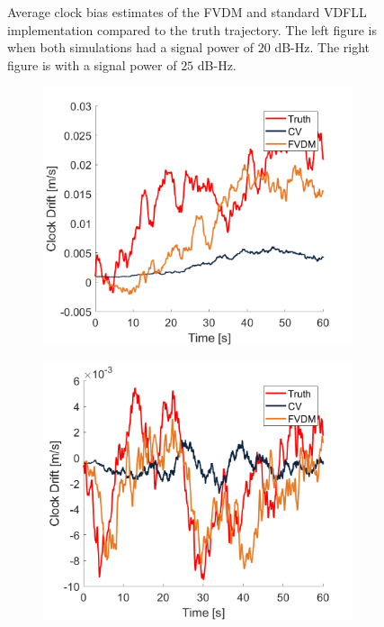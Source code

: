 \begin{figure}[!ht]
\begin{subfigure}{.45\textwidth}
    \end{subfigure}
    \caption{Average clock bias estimates of the FVDM and standard VDFLL implementation compared to the truth trajectory. The left figure is when both simulations had a signal power of \(20\) dB-Hz. The right figure is with a signal power of \(25\) dB-Hz.}\label{fig:Clocks3}
\end{figure}

\begin{figure}[!ht]
    \begin{subfigure}{.45\textwidth}
        \centering
        \includegraphics[width=1\linewidth]{Figures/dynamic/25/CLOCKDRIFT.png}
    \end{subfigure}
    \begin{subfigure}{.45\textwidth}
        \centering
        \includegraphics[width=1\linewidth]{Figures/dynamic/35/CLOCKDRIFT.png}

\end{subfigure}
\end{figure}
